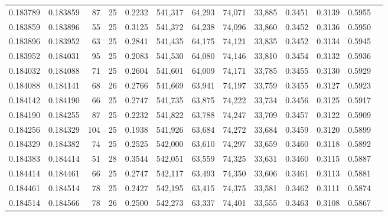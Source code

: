 \begin{tabular}{rrrrrrrrrrrrr}
0.183789 & 0.183859 &    87 &  25 &                                     0.2232 & 541,317 &  64,293 &  74,071 &  33,885 & 0.3451 & 0.3139 & 0.5955 \\
0.183859 & 0.183896 &    55 &  25 &                                     0.3125 & 541,372 &  64,238 &  74,096 &  33,860 & 0.3452 & 0.3136 & 0.5950 \\
0.183896 & 0.183952 &    63 &  25 &                                     0.2841 & 541,435 &  64,175 &  74,121 &  33,835 & 0.3452 & 0.3134 & 0.5945 \\
0.183952 & 0.184031 &    95 &  25 &                                     0.2083 & 541,530 &  64,080 &  74,146 &  33,810 & 0.3454 & 0.3132 & 0.5936 \\
0.184032 & 0.184088 &    71 &  25 &                                     0.2604 & 541,601 &  64,009 &  74,171 &  33,785 & 0.3455 & 0.3130 & 0.5929 \\
0.184088 & 0.184141 &    68 &  26 &                                     0.2766 & 541,669 &  63,941 &  74,197 &  33,759 & 0.3455 & 0.3127 & 0.5923 \\
0.184142 & 0.184190 &    66 &  25 &                                     0.2747 & 541,735 &  63,875 &  74,222 &  33,734 & 0.3456 & 0.3125 & 0.5917 \\
0.184190 & 0.184255 &    87 &  25 &                                     0.2232 & 541,822 &  63,788 &  74,247 &  33,709 & 0.3457 & 0.3122 & 0.5909 \\
0.184256 & 0.184329 &   104 &  25 &                                     0.1938 & 541,926 &  63,684 &  74,272 &  33,684 & 0.3459 & 0.3120 & 0.5899 \\
0.184329 & 0.184382 &    74 &  25 &                                     0.2525 & 542,000 &  63,610 &  74,297 &  33,659 & 0.3460 & 0.3118 & 0.5892 \\
0.184383 & 0.184414 &    51 &  28 &                                     0.3544 & 542,051 &  63,559 &  74,325 &  33,631 & 0.3460 & 0.3115 & 0.5887 \\
0.184414 & 0.184461 &    66 &  25 &                                     0.2747 & 542,117 &  63,493 &  74,350 &  33,606 & 0.3461 & 0.3113 & 0.5881 \\
0.184461 & 0.184514 &    78 &  25 &                                     0.2427 & 542,195 &  63,415 &  74,375 &  33,581 & 0.3462 & 0.3111 & 0.5874 \\
0.184514 & 0.184566 &    78 &  26 &                                     0.2500 & 542,273 &  63,337 &  74,401 &  33,555 & 0.3463 & 0.3108 & 0.5867 \\

\end{tabular}
